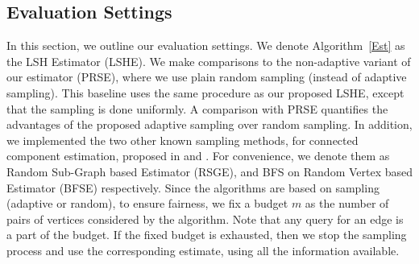 \documentclass{imsart}
\begin{document}
\subsection{Evaluation Settings}
In this section, we outline our evaluation settings. We denote Algorithm~\ref{Est} as the LSH Estimator (LSHE). We make comparisons to the non-adaptive variant of our estimator (PRSE), where we use plain random sampling (instead of adaptive sampling). This baseline uses the same procedure as our proposed LSHE, except that the sampling is done uniformly. A comparison with PRSE quantifies the advantages of the proposed adaptive sampling over random sampling. In addition, we implemented the two other known sampling methods, for connected component estimation, proposed in \cite{1978paper} and \cite{chazelle2005approximating}. For convenience, we denote them as Random Sub-Graph based Estimator (RSGE), and BFS on Random Vertex based Estimator (BFSE) respectively. Since the algorithms are based on sampling (adaptive or random), to ensure fairness, we fix a budget $m$ as the number of pairs of vertices considered by the algorithm. Note that any query for an edge is a part of the budget. If the fixed budget is exhausted, then we stop the sampling process and use the corresponding estimate, using all the information available.
\end{document}
